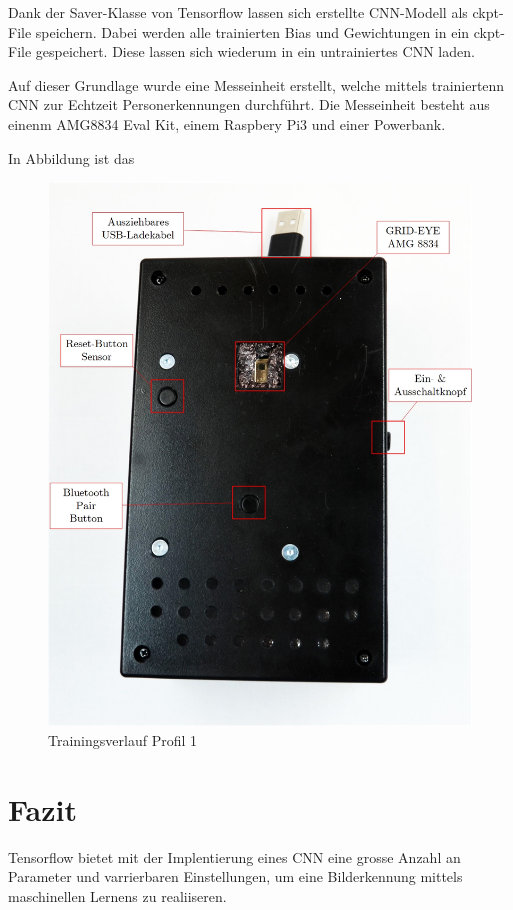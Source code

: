 Dank der Saver-Klasse von Tensorflow lassen sich erstellte \ac{CNN}-Modell als ckpt-File speichern. Dabei werden alle trainierten Bias und Gewichtungen in ein ckpt-File gespeichert. Diese lassen sich wiederum in ein untrainiertes CNN laden.

Auf dieser Grundlage wurde eine Messeinheit erstellt, welche mittels trainiertenn CNN zur Echtzeit Personerkennungen durchführt. Die Messeinheit besteht aus einenm AMG8834 Eval Kit, einem Raspbery Pi3 und einer Powerbank.

In Abbildung ist das 


\begin{figure}[H]
	\centering
	\label{fig:Echtzeitmesseinheit}
	\includegraphics[width=0.8\linewidth]{fig/Echtzeitmessgeraet.jpg}
		\caption{Trainingsverlauf Profil 1}
\end{figure}




\section{Fazit}

Tensorflow bietet mit der Implentierung eines \ac{CNN} eine grosse Anzahl an Parameter und varrierbaren Einstellungen, um eine Bilderkennung mittels maschinellen Lernens zu realiiseren. 

